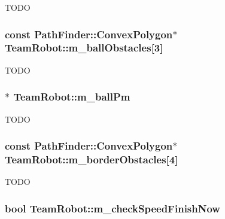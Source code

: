 \label{classTeamRobot_aba2294985cc9a1dc404271e29166da82}
TODO \hypertarget{classTeamRobot_a06fd18a201a66f021e0c72dfd845e26b}{
\subsubsection[{m\_\-ballObstacles}]{\setlength{\rightskip}{0pt plus 5cm}const {\bf PathFinder::ConvexPolygon}$\ast$ {\bf TeamRobot::m\_\-ballObstacles}\mbox{[}3\mbox{]}}}
\label{classTeamRobot_a06fd18a201a66f021e0c72dfd845e26b}
TODO \hypertarget{classTeamRobot_a84b5181a2fadaf7653d32f04fa04d657}{
\subsubsection[{m\_\-ballPm}]{$\ast$ {\bf TeamRobot::m\_\-ballPm}}}
\label{classTeamRobot_a84b5181a2fadaf7653d32f04fa04d657}
TODO \hypertarget{classTeamRobot_a0292337f910ac2bbb300affb87891ba7}{
\subsubsection[{m\_\-borderObstacles}]{\setlength{\rightskip}{0pt plus 5cm}const {\bf PathFinder::ConvexPolygon}$\ast$ {\bf TeamRobot::m\_\-borderObstacles}\mbox{[}4\mbox{]}}}
\label{classTeamRobot_a0292337f910ac2bbb300affb87891ba7}
TODO \hypertarget{classTeamRobot_ac4229cdeb227ab578cfe38023af2db59}{
\subsubsection[{m\_\-checkSpeedFinishNow}]{\setlength{\rightskip}{0pt plus 5cm}bool {\bf TeamRobot::m\_\-checkSpeedFinishNow}}}
